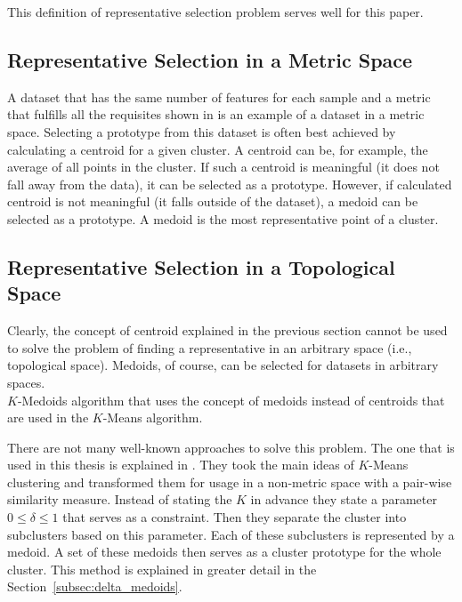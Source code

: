 \documentclass[thesis=B,english]{FITthesis}[2012/10/20]
\begin{document}
This definition of representative selection problem serves well for this paper.

\subsection{Representative Selection in a Metric Space}\label{sec:rep_select_metric}
A dataset that has the same number of features for each sample and a metric that fulfills all the requisites shown in  is an example of a dataset in a metric space.
Selecting a prototype from this dataset is often best achieved by calculating a centroid for a given cluster.
A centroid can be, for example, the average of all points in the cluster.
If such a centroid is meaningful (it does not fall away from the data), it can be selected as a prototype.
However, if calculated centroid is not meaningful (it falls outside of the dataset), a medoid can be selected as a prototype.
A medoid is the most representative point of a cluster.

\subsection{Representative Selection in a Topological Space}\label{sec:rep_select_arbitrary}
Clearly, the concept of centroid explained in the previous section cannot be used to solve the problem of finding a representative in an arbitrary space (i.e., topological space).
Medoids, of course, can be selected for datasets in arbitrary spaces. \\

$K$-Medoids algorithm that uses the concept of medoids instead of centroids that are used in the $K$-Means algorithm.



There are not many well-known approaches to solve this problem.
The one that is used in this thesis is explained in \cite{liebman2015representative}.
They took the main ideas of $K$-Means clustering and transformed them for usage in a non-metric space with a pair-wise similarity measure.
Instead of stating the $K$ in advance they state a parameter  $ 0 \leq \delta \leq 1$ that serves as a constraint.
Then they separate the cluster into subclusters based on this parameter.
Each of these subclusters is represented by a medoid.
A set of these medoids then serves as a cluster prototype for the whole cluster.
This method is explained in greater detail in the Section~\ref{subsec:delta_medoids}.
\end{document}
